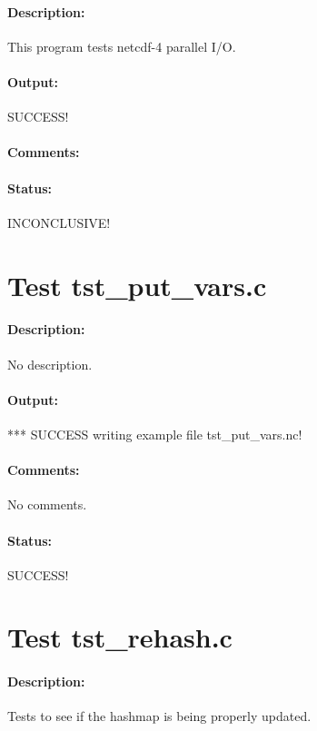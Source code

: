 \paragraph{Description:} This program tests netcdf-4 parallel I/O.

\paragraph{Output:} SUCCESS!

\paragraph{Comments:}

\paragraph{Status:} INCONCLUSIVE!

\section{Test tst\_put\_vars.c}

\paragraph{Description:} No description.

\paragraph{Output:} *** SUCCESS writing example file tst\_put\_vars.nc!

\paragraph{Comments:} No comments.

\paragraph{Status:} SUCCESS!

\section{Test tst\_rehash.c}

\paragraph{Description:} Tests to see if the hashmap is being properly updated.

